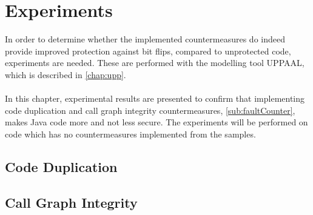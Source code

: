 \chapter{Experiments}
In order to determine whether the implemented countermeasures do indeed provide improved protection against bit flips, compared to unprotected code, experiments are needed. These are performed with the modelling tool UPPAAL, which is described in \cref{chap:upp}.\\\\
In this chapter, experimental results are presented to confirm that implementing code duplication and call graph integrity countermeasures, \cref{sub:faultCounter}, makes Java code more and not less secure. The experiments will be performed on code which has no countermeasures implemented from the \jc samples.
%
\section{Code Duplication}

\section{Call Graph Integrity}

